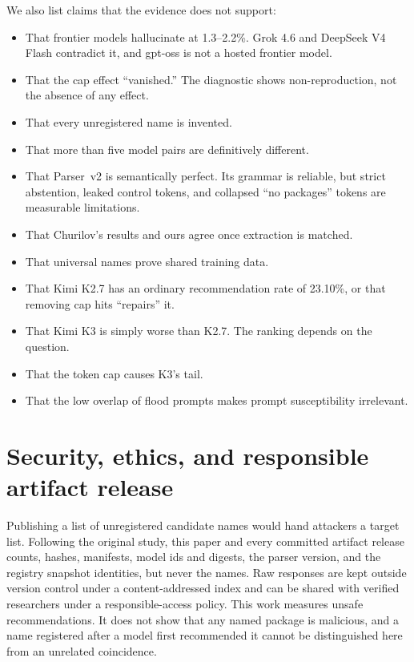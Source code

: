 \documentclass[10pt,twocolumn,letterpaper]{article}
\begin{document}
We also list claims that the evidence does not support:
\begin{itemize}
\item That frontier models hallucinate at 1.3--2.2\%. Grok 4.6 and DeepSeek V4 Flash contradict it,
  and gpt-oss is not a hosted frontier model.
\item That the cap effect ``vanished.'' The diagnostic shows non-reproduction, not the absence of any
  effect.
\item That every unregistered name is invented.
\item That more than five model pairs are definitively different.
\item That Parser~v2 is semantically perfect. Its grammar is reliable, but strict abstention, leaked
  control tokens, and collapsed ``no packages'' tokens are measurable limitations.
\item That Churilov's results and ours agree once extraction is matched.
\item That universal names prove shared training data.
\item That Kimi K2.7 has an ordinary recommendation rate of 23.10\%, or that removing cap hits
  ``repairs'' it.
\item That Kimi K3 is simply worse than K2.7. The ranking depends on the question.
\item That the token cap causes K3's tail.
\item That the low overlap of flood prompts makes prompt susceptibility irrelevant.
\end{itemize}

\section{Security, ethics, and responsible artifact release}
\label{sec:ethics}

Publishing a list of unregistered candidate names would hand attackers a target list. Following the
original study, this paper and every committed artifact release counts, hashes, manifests, model ids
and digests, the parser version, and the registry snapshot identities, but never the names. Raw
responses are kept outside version control under a content-addressed index and can be shared with
verified researchers under a responsible-access policy. This work measures unsafe recommendations. It
does not show that any named package is malicious, and a name registered after a model first
recommended it cannot be distinguished here from an unrelated coincidence.
\end{document}
